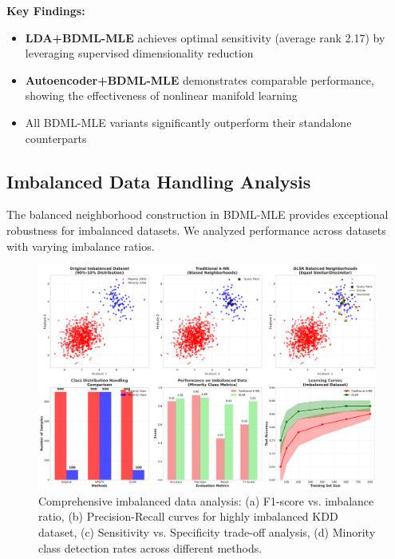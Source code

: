 \documentclass[review]{elsarticle}
\begin{document}
\textbf{Key Findings:}
\begin{itemize}
\item \textbf{LDA+BDML-MLE} achieves optimal sensitivity (average rank 2.17) by leveraging supervised dimensionality reduction
\item \textbf{Autoencoder+BDML-MLE} demonstrates comparable performance, showing the effectiveness of nonlinear manifold learning
\item All BDML-MLE variants significantly outperform their standalone counterparts
\end{itemize}

\subsection{Imbalanced Data Handling Analysis}

The balanced neighborhood construction in BDML-MLE provides exceptional robustness for imbalanced datasets. We analyzed performance across datasets with varying imbalance ratios.

\begin{figure}[htbp]
\centering
\includegraphics[width=\textwidth]{imbalanced_data_handling.pdf}
\caption{Comprehensive imbalanced data analysis: (a) F1-score vs. imbalance ratio, (b) Precision-Recall curves for highly imbalanced KDD dataset, (c) Sensitivity vs. Specificity trade-off analysis, (d) Minority class detection rates across different methods.}
\label{fig:imbalanced_handling}
\end{figure}
\end{document}
